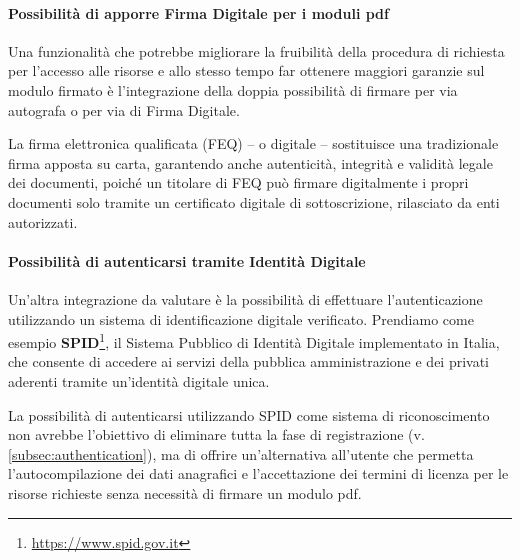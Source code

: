 \paragraph{Possibilità di apporre Firma Digitale per i moduli pdf}
Una funzionalità che potrebbe migliorare la fruibilità della procedura di richiesta
per l'accesso alle risorse e allo stesso tempo far ottenere maggiori garanzie sul
modulo firmato è l'integrazione della doppia possibilità di firmare per via autografa
o per via di Firma Digitale.

La firma elettronica qualificata (FEQ) -- o digitale -- sostituisce una tradizionale
firma apposta su carta, garantendo anche autenticità, integrità e validità legale
dei documenti, poiché un titolare di FEQ può firmare digitalmente i propri documenti
solo tramite un certificato digitale di sottoscrizione, rilasciato da enti autorizzati.

\paragraph{Possibilità di autenticarsi tramite Identità Digitale}
Un'altra integrazione da valutare è la possibilità di effettuare l'autenticazione
utilizzando un sistema di identificazione digitale verificato.
Prendiamo come esempio \textbf{SPID}\footnote{\url{https://www.spid.gov.it}},
il Sistema Pubblico di Identità Digitale implementato in Italia, che consente di
accedere ai servizi della pubblica amministrazione e dei privati aderenti tramite
un'identità digitale unica.

La possibilità di autenticarsi utilizzando SPID come sistema di riconoscimento
non avrebbe l’obiettivo di eliminare tutta la fase di registrazione
(v. \autoref{subsec:authentication}), ma di offrire un’alternativa all’utente che
permetta l'autocompilazione dei dati anagrafici e l'accettazione dei termini di
licenza per le risorse richieste senza necessità di firmare un modulo pdf.